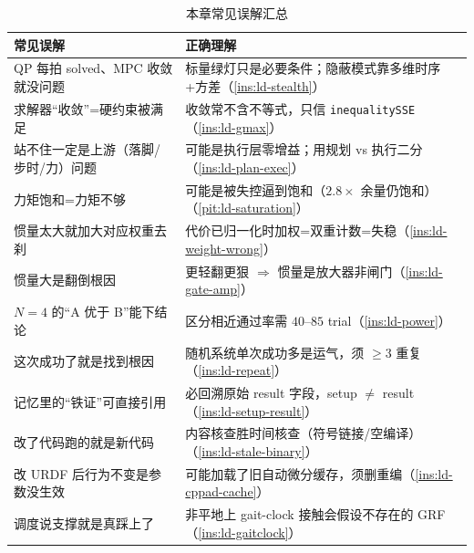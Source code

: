 \begin{table}[H]\centering\small
\caption{本章常见误解汇总}
\begin{tabular}{p{} p{}}
\toprule
\textbf{常见误解} & \textbf{正确理解} \\
\midrule
QP 每拍 solved、MPC 收敛就没问题 & 标量绿灯只是必要条件；隐蔽模式靠多维时序+方差（\cref{ins:ld-stealth}）\\
求解器“收敛”=硬约束被满足 & 收敛常不含不等式，只信 \texttt{inequalitySSE}（\cref{ins:ld-gmax}）\\
站不住一定是上游（落脚/步时/力）问题 & 可能是执行层零增益；用规划 vs 执行二分（\cref{ins:ld-plan-exec}）\\
力矩饱和=力矩不够 & 可能是被失控逼到饱和（$2.8\times$ 余量仍饱和）（\cref{pit:ld-saturation}）\\
惯量太大就加大对应权重去刹 & 代价已归一化时加权=双重计数=失稳（\cref{ins:ld-weight-wrong}）\\
惯量大是翻倒根因 & 更轻翻更狠 $\Rightarrow$ 惯量是放大器非闸门（\cref{ins:ld-gate-amp}）\\
$N=4$ 的“A 优于 B”能下结论 & 区分相近通过率需 $40$--$85$ trial（\cref{ins:ld-power}）\\
这次成功了就是找到根因 & 随机系统单次成功多是运气，须 $\ge 3$ 重复（\cref{ins:ld-repeat}）\\
记忆里的“铁证”可直接引用 & 必回溯原始 result 字段，setup $\ne$ result（\cref{ins:ld-setup-result}）\\
改了代码跑的就是新代码 & 内容核查胜时间核查（符号链接/空编译）（\cref{ins:ld-stale-binary}）\\
改 URDF 后行为不变是参数没生效 & 可能加载了旧自动微分缓存，须删重编（\cref{ins:ld-cppad-cache}）\\
调度说支撑就是真踩上了 & 非平地上 gait-clock 接触会假设不存在的 GRF（\cref{ins:ld-gaitclock}）\\
\bottomrule
\end{tabular}
\end{table}

